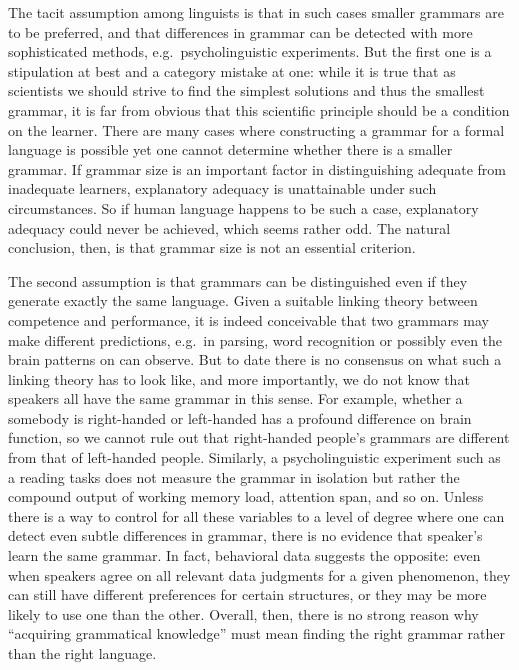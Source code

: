 The tacit assumption among linguists is that in such cases smaller grammars are to be preferred, and that differences in grammar can be detected with more sophisticated methods, e.g.\ psycholinguistic experiments.
But the first one is a stipulation at best and a category mistake at one: while it is true that as scientists we should strive to find the simplest solutions and thus the smallest grammar, it is far from obvious that this scientific principle should be a condition on the learner.
There are many cases where constructing a grammar for a formal language is possible yet one cannot determine whether there is a smaller grammar.
If grammar size is an important factor in distinguishing adequate from inadequate learners, explanatory adequacy is unattainable under such circumstances.
So if human language happens to be such a case, explanatory adequacy could never be achieved, which seems rather odd.
The natural conclusion, then, is that grammar size is not an essential criterion.

The second assumption is that grammars can be distinguished even if they generate exactly the same language.
Given a suitable linking theory between competence and performance, it is indeed conceivable that two grammars may make different predictions, e.g.\ in parsing, word recognition or possibly even the brain patterns on can observe.
But to date there is no consensus on what such a linking theory has to look like, and more importantly, we do not know that speakers all have the same grammar in this sense.
For example, whether a somebody is right-handed or left-handed has a profound difference on brain function, so we cannot rule out that right-handed people's grammars are different from that of left-handed people.
Similarly, a psycholinguistic experiment such as a reading tasks does not measure the grammar in isolation but rather the compound output of working memory load, attention span, and so on.
Unless there is a way to control for all these variables to a level of degree where one can detect even subtle differences in grammar, there is no evidence that speaker's learn the same grammar.
In fact, behavioral data suggests the opposite: even when speakers agree on all relevant data judgments for a given phenomenon, they can still have different preferences for certain structures, or they may be more likely to use one than the other.
Overall, then, there is no strong reason why ``acquiring grammatical knowledge'' must mean finding the right grammar rather than the right language.

